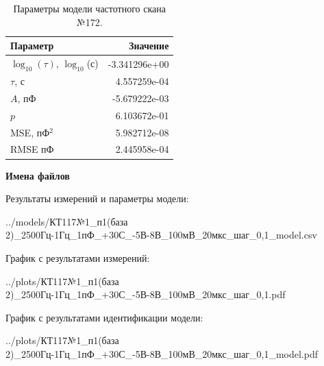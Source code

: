 \begin{table}[!ht]
    \centering
    \caption{Параметры модели частотного скана №172.}
    \begin{tabular}{|l|r|}
        \hline
        Параметр                                       & Значение                  \\ \hline
        $\log_{10}(\tau)$, $\log_{10}$(с)              & -3.341296e+00             \\ \hline
        $\tau$, с                                      & 4.557259e-04              \\ \hline
        $A$, пФ                                        & -5.679222e-03             \\ \hline
        $p$                                            & 6.103672e-01              \\ \hline
        MSE, пФ$^2$                                    & 5.982712e-08              \\ \hline
        RMSE пФ                                        & 2.445958e-04              \\ \hline
    \end{tabular}
    \label{table:frequency_scan_model_172}
\end{table}

\textbf{Имена файлов}

Результаты измерений и параметры модели:

\scriptsize../models/КТ117№1\_п1(база 2)\_2500Гц-1Гц\_1пФ\_+30С\_-5В-8В\_100мВ\_20мкс\_шаг\_0,1\_model.csv
\normalsize

График с результатами измерений:

\scriptsize../plots/КТ117№1\_п1(база 2)\_2500Гц-1Гц\_1пФ\_+30С\_-5В-8В\_100мВ\_20мкс\_шаг\_0,1.pdf
\normalsize

График с результатами идентификации модели:

\scriptsize../plots/КТ117№1\_п1(база 2)\_2500Гц-1Гц\_1пФ\_+30С\_-5В-8В\_100мВ\_20мкс\_шаг\_0,1\_model.pdf
\normalsize

